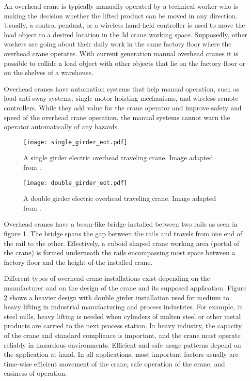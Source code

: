 \documentclass[12pt,a4paper,oneside,pdftex]{report}
\begin{document}
An overhead crane is typically manually operated by a technical worker who is making the decision whether the lifted product can be moved in any direction. Usually, a control pendant, or a wireless hand-held controller is used to move the load object to a desired location in the 3d crane working space. Supposedly, other workers are going about their daily work in the same factory floor where the overhead crane operates. With current generation manual overhead cranes it is possible to collide a load object with other objects that lie on the factory floor or on the shelves of a warehouse. 

Overhead cranes have automation systems that help manual operation, such as load anti-sway systems, single motor hoisting mechanisms, and wireless remote controllers. While they add value for the crane operator and improve safety and speed of the overhead crane operation, the manual systems cannot warn the operator automatically of any hazards. 

\begin{figure}[ht]
  \begin{center}
    \texttt{[image: single\_girder\_eot.pdf]}
    \caption{A single girder electric overhead traveling crane. Image adapted from \citep{Abus14}.}
    \label{fig:single_girder_eot}
  \end{center}
\end{figure}

\begin{figure}[ht]
  \begin{center}
    \texttt{[image: double\_girder\_eot.pdf]}
    \caption{A double girder electric overhead traveling crane. Image adapted from \citep{Abus14}.}
    \label{fig:double_girder_eot}
  \end{center}
\end{figure}

Overhead cranes have a beam-like bridge installed between two rails as seen in figure \ref{fig:single_girder_eot}. The bridge spans the gap between the rails and travels from one end of the rail to the other. Effectively, a cuboid shaped crane working area (portal of the crane) is formed underneath the rails encompassing most space between a factory floor and the height of the installed crane.

Different types of overhead crane installations exist depending on the manufacturer and on the design of the crane and its supposed application. Figure \ref{fig:double_girder_eot} shows a heavier design with double girder installation used for medium to heavy lifting in industrial manufacturing and process industries. For example, in steel mills, heavy lifting is needed when cylinders of molten steel or other metal products are carried to the next process station. In heavy industry, the capacity of the crane and standard compliance is important, and the crane must operate reliably in hazardous environments. Efficient and safe usage patterns depend on the application at hand. In all applications, most important factors usually are time-wise efficient movement of the crane, safe operation of the crane, and easiness of operation.
\end{document}
